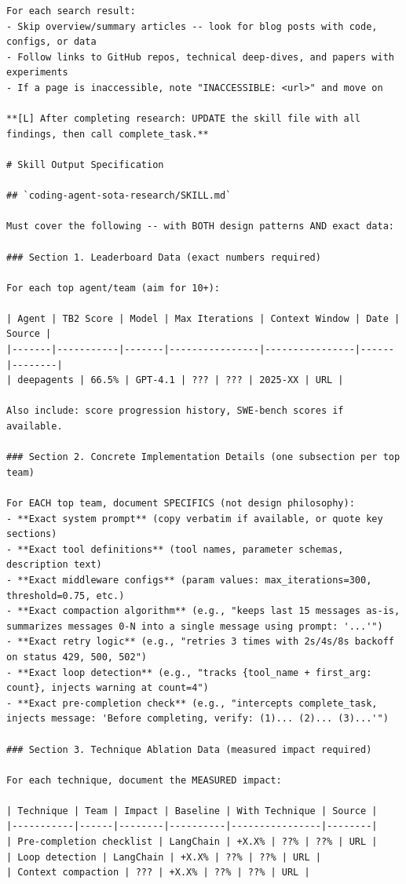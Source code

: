 \begin{tcolorbox}
\begin{lstlisting}
For each search result:
- Skip overview/summary articles -- look for blog posts with code, configs, or data
- Follow links to GitHub repos, technical deep-dives, and papers with experiments
- If a page is inaccessible, note "INACCESSIBLE: <url>" and move on

**[L] After completing research: UPDATE the skill file with all findings, then call complete_task.**

# Skill Output Specification

## `coding-agent-sota-research/SKILL.md`

Must cover the following -- with BOTH design patterns AND exact data:

### Section 1. Leaderboard Data (exact numbers required)

For each top agent/team (aim for 10+):

| Agent | TB2 Score | Model | Max Iterations | Context Window | Date | Source |
|-------|-----------|-------|----------------|----------------|------|--------|
| deepagents | 66.5% | GPT-4.1 | ??? | ??? | 2025-XX | URL |

Also include: score progression history, SWE-bench scores if available.

### Section 2. Concrete Implementation Details (one subsection per top team)

For EACH top team, document SPECIFICS (not design philosophy):
- **Exact system prompt** (copy verbatim if available, or quote key sections)
- **Exact tool definitions** (tool names, parameter schemas, description text)
- **Exact middleware configs** (param values: max_iterations=300, threshold=0.75, etc.)
- **Exact compaction algorithm** (e.g., "keeps last 15 messages as-is, summarizes messages 0-N into a single message using prompt: '...'")
- **Exact retry logic** (e.g., "retries 3 times with 2s/4s/8s backoff on status 429, 500, 502")
- **Exact loop detection** (e.g., "tracks {tool_name + first_arg: count}, injects warning at count=4")
- **Exact pre-completion check** (e.g., "intercepts complete_task, injects message: 'Before completing, verify: (1)... (2)... (3)...'")

### Section 3. Technique Ablation Data (measured impact required)

For each technique, document the MEASURED impact:

| Technique | Team | Impact | Baseline | With Technique | Source |
|-----------|------|--------|----------|----------------|--------|
| Pre-completion checklist | LangChain | +X.X% | ??% | ??% | URL |
| Loop detection | LangChain | +X.X% | ??% | ??% | URL |
| Context compaction | ??? | +X.X% | ??% | ??% | URL |


\end{lstlisting}
\end{tcolorbox}

